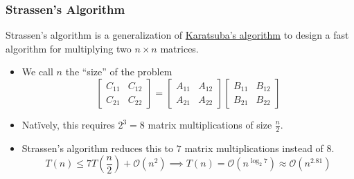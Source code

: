 \subsubsection{Strassen's Algorithm}

Strassen's algorithm is a generalization of \hyperref[subsubsec:karatsuba]{Karatsuba's algorithm} to design a fast algorithm for multiplying two $n \times n$ matrices.

\begin{itemize}
    \item We call $n$ the ``size'' of the problem \[
        \begin{bmatrix}
            C_{11} & C_{12} \\
            C_{21} & C_{22}
        \end{bmatrix} = \begin{bmatrix}
            A_{11} & A_{12} \\
            A_{21} & A_{22}
        \end{bmatrix} \begin{bmatrix}
            B_{11} & B_{12} \\
            B_{21} & B_{22}
        \end{bmatrix}
    \]

    \item Nat\"ively, this requires $2^3 = 8$ matrix multiplications of size $\frac{n}{2}$. 
    
    \item Strassen's algorithm reduces this to $7$ matrix multiplications instead of $8$. \[
        T(n) \le 7T\left( \frac{n}{2} \right) + \mathcal{O}(n^2) \implies T(n) = \mathcal{O}(n^{\log_2 7}) \approx \mathcal{O}(n^{2.81})
    \]
\end{itemize}
\vspace{-2em}
